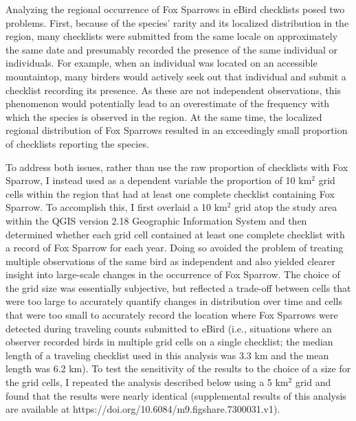 \documentclass[fleqn,10pt,lineno]{wlpeerj} %
\begin{document}
Analyzing the regional occurrence of Fox Sparrows in eBird checklists posed two problems. First, because of the species’ rarity and its localized distribution in the region, many checklists were submitted from the same locale on approximately the same date and presumably recorded the presence of the same individual or individuals. For example, when an individual was located on an accessible mountaintop, many birders would actively seek out that individual and submit a checklist recording its presence. As these are not independent observations, this phenomenon would potentially lead to an overestimate of the frequency with which the species is observed in the region. At the same time, the localized regional distribution of Fox Sparrows resulted in an exceedingly small proportion of checklists reporting the species. 

To address both issues, rather than use the raw proportion of checklists with Fox Sparrow, I instead used as a dependent variable the proportion of 10 km$^{2}$ grid cells within the region that had at least one complete checklist containing Fox Sparrow. To accomplish this, I first overlaid a 10 km$^{2}$ grid atop the study area within the QGIS version 2.18 Geographic Information System \citep{QGIS_Development_Team2016-iw} and then determined whether each grid cell contained at least one complete checklist with a record of Fox Sparrow for each year. Doing so avoided the problem of treating multiple observations of the same bird as independent and also yielded clearer insight into large-scale changes in the occurrence of Fox Sparrow. The choice of the grid size was essentially subjective, but reflected a trade-off between cells that were too large to accurately quantify changes in distribution over time and cells that were too small to accurately record the location where Fox Sparrows were detected during traveling counts submitted to eBird (i.e., situations where an observer recorded birds in multiple grid cells on a single checklist; the median length of a traveling checklist used in this analysis was 3.3 km and the mean length was 6.2 km). To test the sensitivity of the results to the choice of a size for the grid cells, I repeated the analysis described below using a 5 km$^{2}$ grid and found that the results were nearly identical (supplemental results of this analysis are available at https://doi.org/10.6084/m9.figshare.7300031.v1). 
\end{document}

